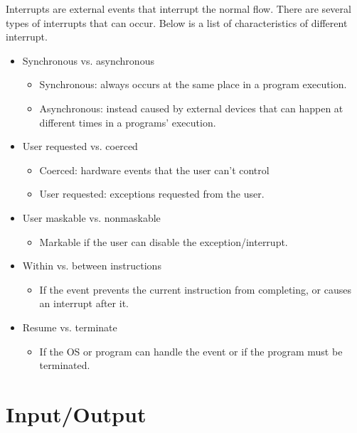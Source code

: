 Interrupts are external events that interrupt the normal flow. There are several types of interrupts that can occur. Below is a list of characteristics of different interrupt.

\begin{itemize}
  \item Synchronous vs. asynchronous
  \begin{itemize}
    \item Synchronous: always occurs at the same place in a program execution.
    \item Asynchronous: instead caused by external devices that can happen at different times in a programs' execution.
  \end{itemize}
  \item User requested vs. coerced
  \begin{itemize}
    \item Coerced: hardware events that the user can't control
    \item User requested: exceptions requested from the user.
  \end{itemize}
  \item User maskable vs. nonmaskable
  \begin{itemize}
    \item Markable if the user can disable the exception/interrupt.
  \end{itemize}
  \item Within vs. between instructions
  \begin{itemize}
    \item If the event prevents the current instruction from completing, or causes an interrupt after it.
  \end{itemize}
  \item Resume vs. terminate
  \begin{itemize}
    \item If the OS or program can handle the event or if the program must be terminated.
  \end{itemize}
\end{itemize}


\section{Input/Output}

